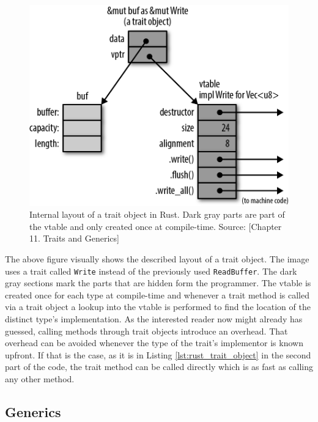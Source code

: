 \begin{figure}[h!]
	\centering \includegraphics[width=\linewidth]{PICs/rust_vtable.png}
	\caption{Internal layout of a trait object in Rust. Dark gray parts are part of the vtable and only created once at compile-time. Source: \cite{ProRus}[Chapter 11. Traits and Generics]}
	\label{fig:rust_vtable}
\end{figure}

\noindent
The above figure visually shows the described layout of a trait object. The image uses a trait called \texttt{Write} instead of the previously used \texttt{ReadBuffer}. The dark gray sections mark the parts that are hidden form the programmer. The vtable is created once for each type at compile-time and whenever a trait method is called via a trait object a lookup into the vtable is performed to find the location of the distinct type's implementation. As the interested reader now might already has guessed, calling methods through trait objects introduce an overhead.
That overhead can be avoided whenever the type of the trait's implementor is known upfront. If that is the case, as it is in Listing \ref{lst:rust_trait_object} in the second part of the code, the trait method can be called directly which is as fast as calling any other method.

\subsection{Generics}

